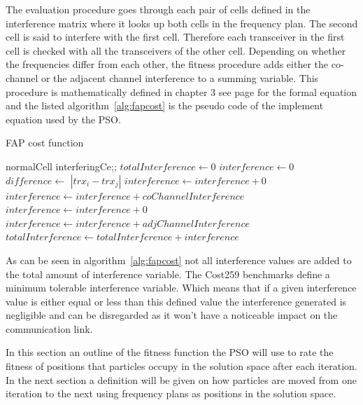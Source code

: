 The evaluation procedure goes through each pair of cells defined in the interference matrix where it looks up both cells in the frequency plan. The second cell is said to interfere with the first cell. Therefore each transceiver in the first cell is checked with all the transceivers of the other cell. Depending on whether the frequencies differ from each other, the fitness procedure adds either the co-channel or the adjacent channel interference to a summing variable. This procedure is mathematically defined in chapter 3 see page \pageref{E:costFunction} for the formal equation and the listed algorithm~\ref{alg:fapcost} is the pseudo code of the implement equation used by the PSO. 

\begin{algorithm}
\caption{FAP cost function}
\label{alg:fapcost}
	\begin{algorithmic}[1]
	\REQUIRE normalCell
	\REQUIRE interferingCe;;
	\STATE $totalInterference \leftarrow $0
			\STATE $interference \leftarrow 0$
			\STATE $difference \leftarrow$ $|trx_i - trx_j|$
					\STATE $interference \leftarrow interference + 0$
				\ELSE
					\STATE $interference \leftarrow interference + coChannelInterference$
				\ENDIF
			\ELSE
						\STATE $interference \leftarrow interference + 0$
					\ELSE
						\STATE $interference \leftarrow interference + adjChannelInterference$
					\ENDIF
				\ENDIF
			\ENDIF
			\STATE $totalInterference \leftarrow totalInterference + interference$
		\ENDFOR
	\ENDFOR
	\end{algorithmic}
\end{algorithm}

As can be seen in algorithm~\ref{alg:fapcost} not all interference values are added to the total amount of interference variable. The Cost259 benchmarks define a minimum tolerable interference variable. Which means that if a given interference value is either equal or less than this defined value the interference generated is negligible and can be disregarded as it won't have a noticeable impact on the communication link.

In this section an outline of the fitness function the PSO will use to rate the fitness of positions that particles occupy in the solution space after each iteration. In the next section a definition will be given on how particles are moved from one iteration to the next using frequency plans as positions in the solution space.
